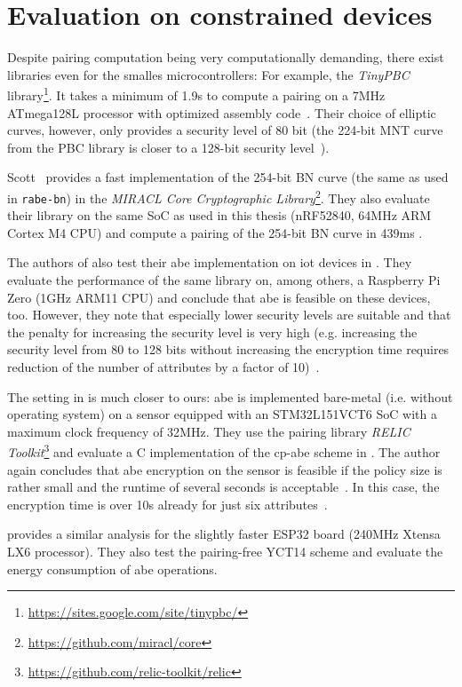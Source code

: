 \section{Evaluation on constrained devices}

Despite pairing computation being very computationally demanding, there exist libraries even for the smalles microcontrollers:
For example, the \emph{TinyPBC} library\footnote{\url{https://sites.google.com/site/tinypbc/}}.
It takes a minimum of 1.9s to compute a pairing on a 7MHz ATmega128L processor with optimized assembly code~\cite{oliveira_tinypbc_2011}. 
Their choice of elliptic curves, however, only provides a security level of 80 bit (the 224-bit MNT curve from the PBC library is closer to a 128-bit security level~\cite{akinyele_self-protecting_2010}).

Scott~\cite{scott_deployment_2020} provides a fast implementation of the 254-bit BN curve (the same as used in \texttt{rabe-bn}) in the \emph{MIRACL Core Cryptographic Library}\footnote{\url{https://github.com/miracl/core}}.
They also evaluate their library on the same SoC as used in this thesis (nRF52840, 64MHz ARM Cortex M4 CPU) and compute a pairing of the 254-bit BN curve in 439ms \cite[Table~4]{scott_deployment_2020}.


The authors of \cite{ambrosin_feasibility_2015} also test their \acrshort{abe} implementation on \gls{iot} devices in \cite{ambrosin_feasibility_2016}.
They evaluate the performance of the same library on, among others, a Raspberry Pi Zero (1GHz ARM11 CPU) and conclude that \acrshort{abe} is feasible on these devices, too.
However, they note that especially lower security levels are suitable and that the penalty for increasing the security level is very high (e.g. increasing the security level from 80 to 128 bits without increasing the encryption time requires reduction of the number of attributes by a factor of 10)~\cite{ambrosin_feasibility_2016}.

The setting in \cite{borgh_attribute-based_2016} is much closer to ours: \acrshort{abe} is implemented bare-metal (i.e. without operating system) on a sensor equipped with an STM32L151VCT6 SoC with a maximum clock frequency of 32MHz.
They use the pairing library \emph{RELIC Toolkit}\footnote{\url{https://github.com/relic-toolkit/relic}} and evaluate a C implementation of the \acrshort{cp-abe} scheme in \cite{waters_ciphertext-policy_2011}.
The author again concludes that \acrshort{abe} encryption on the sensor is feasible if the policy size is rather small and the runtime of several seconds is acceptable~\cite{borgh_attribute-based_2016}.
In this case, the encryption time is over 10s already for just six attributes~\cite{borgh_attribute-based_2016}.

\cite{girgenti_feasibility_2019} provides a similar analysis for the slightly faster ESP32 board (240MHz Xtensa LX6 processor).
They also test the pairing-free YCT14 scheme \cite{yao_lightweight_2015} and evaluate the energy consumption of \acrshort{abe} operations.

